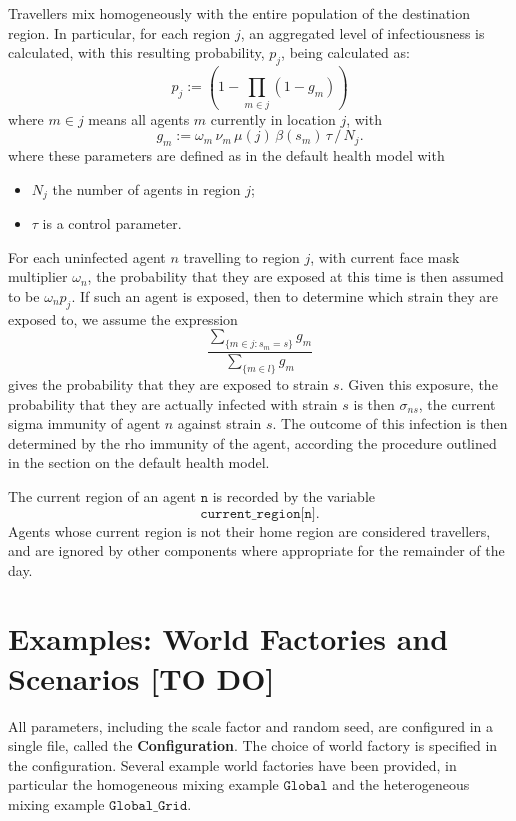 \documentclass[10pt,letterpaper]{article}
\begin{document}
Travellers mix homogeneously with the entire population of the destination region. In particular, for each region $j$, an aggregated level of infectiousness is calculated, with this resulting probability, $p_j$, being calculated as:
\begin{equation*}
p_j := \left(1 - \prod_{m \in j} (1 - g_m)\right)
\end{equation*}
where $m \in j$ means all agents $m$ currently in location $j$, with
\begin{equation*}
g_m  := \omega_m\, \nu_m\, \mu(j)\, \beta(s_m)\, \tau\, /\, N_j.
\end{equation*}
where these parameters are defined as in the default health model with
\begin{itemize}
\item $N_j$ the number of agents in region $j$;
\item $\tau$ is a control parameter.
\end{itemize}
For each uninfected agent $n$ travelling to region $j$, with current face mask multiplier $\omega_n$, the probability that they are exposed at this time is then assumed to be $\omega_n p_j$. If such an agent is exposed, then to determine which strain they are exposed to, we assume the expression
\begin{equation*}
\frac{\sum_{\{m \in j: s_m = s\}} g_m}{\sum_{\{m \in l\}} g_m}
\end{equation*}
gives the probability that they are exposed to strain $s$. Given this exposure, the probability that they are actually infected with strain $s$ is then $\sigma_{ns}$, the current sigma immunity of agent $n$ against strain $s$. The outcome of this infection is then determined by the rho immunity of the agent, according the procedure outlined in the section on the default health model.

The current region of an agent $\texttt{n}$ is recorded by the variable $$\texttt{current{\_}region[n]}.$$ Agents whose current region is not their home region are considered travellers, and are ignored by other components where appropriate for the remainder of the day.

\section{Examples: World Factories and Scenarios [TO DO]}

All parameters, including the scale factor and random seed, are configured in a single file, called the \textbf{Configuration}. The choice of world factory is specified in the configuration. Several example world factories have been provided, in particular the homogeneous mixing example $\texttt{Global}$ and the heterogeneous mixing example $\texttt{Global{\_}Grid}$.
\end{document}
